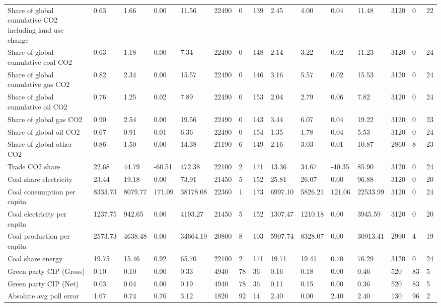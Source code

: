 \begin{longtable}{lllllllllllllll}
Share of global cumulative CO2 including land use change & 0.63 & 1.66 & 0.00 & 11.56 & 22490 & 0 & 139 & 2.45 & 4.00 & 0.04 & 11.48 & 3120 & 0 & 22\\
Share of global cumulative coal CO2 & 0.63 & 1.18 & 0.00 & 7.34 & 22490 & 0 & 148 & 2.14 & 3.22 & 0.02 & 11.23 & 3120 & 0 & 24\\
Share of global cumulative gas CO2 & 0.82 & 2.34 & 0.00 & 15.57 & 22490 & 0 & 146 & 3.16 & 5.57 & 0.02 & 15.53 & 3120 & 0 & 24\\
Share of global cumulative oil CO2 & 0.76 & 1.25 & 0.02 & 7.89 & 22490 & 0 & 153 & 2.04 & 2.79 & 0.06 & 7.82 & 3120 & 0 & 24\\
\addlinespace
Share of global gas CO2 & 0.90 & 2.54 & 0.00 & 19.56 & 22490 & 0 & 143 & 3.44 & 6.07 & 0.04 & 19.22 & 3120 & 0 & 23\\
Share of global oil CO2 & 0.67 & 0.91 & 0.01 & 6.36 & 22490 & 0 & 154 & 1.35 & 1.78 & 0.04 & 5.53 & 3120 & 0 & 24\\
Share of global other CO2 & 0.86 & 1.50 & 0.00 & 14.38 & 21190 & 6 & 149 & 2.16 & 3.03 & 0.01 & 10.87 & 2860 & 8 & 23\\
Trade CO2 share & 22.68 & 44.79 & -60.51 & 472.38 & 22100 & 2 & 171 & 13.36 & 34.67 & -40.35 & 85.90 & 3120 & 0 & 24\\
Coal share electricity & 23.44 & 19.18 & 0.00 & 73.91 & 21450 & 5 & 152 & 25.81 & 26.07 & 0.00 & 96.88 & 3120 & 0 & 20\\
\addlinespace
Coal consumption per capita & 8333.73 & 8079.77 & 171.09 & 38178.08 & 22360 & 1 & 173 & 6997.10 & 5826.21 & 121.06 & 22533.99 & 3120 & 0 & 24\\
Coal electricity per capita & 1237.75 & 942.65 & 0.00 & 4193.27 & 21450 & 5 & 152 & 1307.47 & 1210.18 & 0.00 & 3945.59 & 3120 & 0 & 20\\
Coal production per capita & 2573.73 & 4638.48 & 0.00 & 34664.19 & 20800 & 8 & 103 & 5907.74 & 8328.07 & 0.00 & 30913.41 & 2990 & 4 & 19\\
Coal share energy & 19.75 & 15.46 & 0.92 & 65.70 & 22100 & 2 & 171 & 19.71 & 19.41 & 0.70 & 76.29 & 3120 & 0 & 24\\
Green party CIP (Gross) & 0.10 & 0.10 & 0.00 & 0.33 & 4940 & 78 & 36 & 0.16 & 0.18 & 0.00 & 0.46 & 520 & 83 & 5\\
\addlinespace
Green party CIP (Net) & 0.03 & 0.04 & 0.00 & 0.19 & 4940 & 78 & 36 & 0.11 & 0.15 & 0.00 & 0.36 & 520 & 83 & 5\\
Absolute avg poll error & 1.67 & 0.74 & 0.76 & 3.12 & 1820 & 92 & 14 & 2.40 & 0.00 & 2.40 & 2.40 & 130 & 96 & 2\\

\end{longtable}
